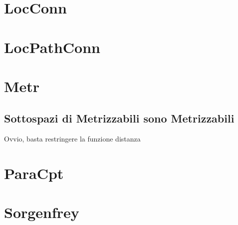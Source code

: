 \documentclass[a4paper,11pt,NoNotes,GeneralMath]{stdmdoc}
\begin{document}
	\section*{LocConn}
	\section*{LocPathConn}
	\section*{Metr}
	\subsection*{Sottospazi di Metrizzabili sono Metrizzabili}
	Ovvio, basta restringere la funzione distanza

	\section*{ParaCpt}


	\section*{Sorgenfrey}
	
\end{document}
